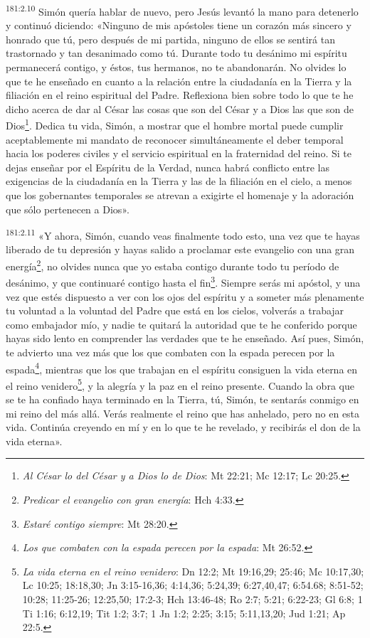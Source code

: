 \par 
\textsuperscript{181:2.10} Simón quería hablar de nuevo, pero Jesús levantó la mano para detenerlo y continuó diciendo: «Ninguno de mis apóstoles tiene un corazón más sincero y honrado que tú, pero después de mi partida, ninguno de ellos se sentirá tan trastornado y tan desanimado como tú. Durante todo tu desánimo mi espíritu permanecerá contigo, y éstos, tus hermanos, no te abandonarán. No olvides lo que te he enseñado en cuanto a la relación entre la ciudadanía en la Tierra y la filiación en el reino espiritual del Padre. Reflexiona bien sobre todo lo que te he dicho acerca de dar al César las cosas que son del César y a Dios las que son de Dios\footnote{\textit{Al César lo del César y a Dios lo de Dios}: Mt 22:21; Mc 12:17; Lc 20:25.}. Dedica tu vida, Simón, a mostrar que el hombre mortal puede cumplir aceptablemente mi mandato de reconocer simultáneamente el deber temporal hacia los poderes civiles y el servicio espiritual en la fraternidad del reino. Si te dejas enseñar por el Espíritu de la Verdad, nunca habrá conflicto entre las exigencias de la ciudadanía en la Tierra y las de la filiación en el cielo, a menos que los gobernantes temporales se atrevan a exigirte el homenaje y la adoración que sólo pertenecen a Dios».

\par 
\textsuperscript{181:2.11} «Y ahora, Simón, cuando veas finalmente todo esto, una vez que te hayas liberado de tu depresión y hayas salido a proclamar este evangelio con una gran energía\footnote{\textit{Predicar el evangelio con gran energía}: Hch 4:33.}, no olvides nunca que yo estaba contigo durante todo tu período de desánimo, y que continuaré contigo hasta el fin\footnote{\textit{Estaré contigo siempre}: Mt 28:20.}. Siempre serás mi apóstol, y una vez que estés dispuesto a ver con los ojos del espíritu y a someter más plenamente tu voluntad a la voluntad del Padre que está en los cielos, volverás a trabajar como embajador mío, y nadie te quitará la autoridad que te he conferido porque hayas sido lento en comprender las verdades que te he enseñado. Así pues, Simón, te advierto una vez más que los que combaten con la espada perecen por la espada\footnote{\textit{Los que combaten con la espada perecen por la espada}: Mt 26:52.}, mientras que los que trabajan en el espíritu consiguen la vida eterna en el reino venidero\footnote{\textit{La vida eterna en el reino venidero}: Dn 12:2; Mt 19:16,29; 25:46; Mc 10:17,30; Lc 10:25; 18:18,30; Jn 3:15-16,36; 4:14,36; 5:24,39; 6:27,40,47; 6:54.68; 8:51-52; 10:28; 11:25-26; 12:25,50; 17:2-3; Hch 13:46-48; Ro 2:7; 5:21; 6:22-23; Gl 6:8; 1 Ti 1:16; 6:12,19; Tit 1:2; 3:7; 1 Jn 1:2; 2:25; 3:15; 5:11,13,20; Jud 1:21; Ap 22:5.}, y la alegría y la paz en el reino presente. Cuando la obra que se te ha confiado haya terminado en la Tierra, tú, Simón, te sentarás conmigo en mi reino del más allá. Verás realmente el reino que has anhelado, pero no en esta vida. Continúa creyendo en mí y en lo que te he revelado, y recibirás el don de la vida eterna».

